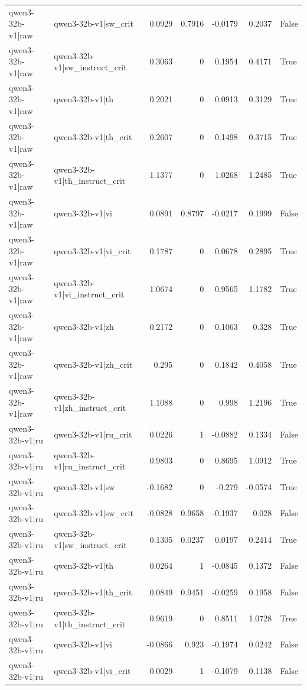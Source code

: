 \begin{table}
\begin{tabular}{l l r r r r l}
qwen3-32b-v1|raw & qwen3-32b-v1|sw_crit & 0.0929 & 0.7916 & -0.0179 & 0.2037 & False \\
qwen3-32b-v1|raw & qwen3-32b-v1|sw_instruct_crit & 0.3063 & 0 & 0.1954 & 0.4171 & True \\
qwen3-32b-v1|raw & qwen3-32b-v1|th & 0.2021 & 0 & 0.0913 & 0.3129 & True \\
qwen3-32b-v1|raw & qwen3-32b-v1|th_crit & 0.2607 & 0 & 0.1498 & 0.3715 & True \\
qwen3-32b-v1|raw & qwen3-32b-v1|th_instruct_crit & 1.1377 & 0 & 1.0268 & 1.2485 & True \\
qwen3-32b-v1|raw & qwen3-32b-v1|vi & 0.0891 & 0.8797 & -0.0217 & 0.1999 & False \\
qwen3-32b-v1|raw & qwen3-32b-v1|vi_crit & 0.1787 & 0 & 0.0678 & 0.2895 & True \\
qwen3-32b-v1|raw & qwen3-32b-v1|vi_instruct_crit & 1.0674 & 0 & 0.9565 & 1.1782 & True \\
qwen3-32b-v1|raw & qwen3-32b-v1|zh & 0.2172 & 0 & 0.1063 & 0.328 & True \\
qwen3-32b-v1|raw & qwen3-32b-v1|zh_crit & 0.295 & 0 & 0.1842 & 0.4058 & True \\
qwen3-32b-v1|raw & qwen3-32b-v1|zh_instruct_crit & 1.1088 & 0 & 0.998 & 1.2196 & True \\
qwen3-32b-v1|ru & qwen3-32b-v1|ru_crit & 0.0226 & 1 & -0.0882 & 0.1334 & False \\
qwen3-32b-v1|ru & qwen3-32b-v1|ru_instruct_crit & 0.9803 & 0 & 0.8695 & 1.0912 & True \\
qwen3-32b-v1|ru & qwen3-32b-v1|sw & -0.1682 & 0 & -0.279 & -0.0574 & True \\
qwen3-32b-v1|ru & qwen3-32b-v1|sw_crit & -0.0828 & 0.9658 & -0.1937 & 0.028 & False \\
qwen3-32b-v1|ru & qwen3-32b-v1|sw_instruct_crit & 0.1305 & 0.0237 & 0.0197 & 0.2414 & True \\
qwen3-32b-v1|ru & qwen3-32b-v1|th & 0.0264 & 1 & -0.0845 & 0.1372 & False \\
qwen3-32b-v1|ru & qwen3-32b-v1|th_crit & 0.0849 & 0.9451 & -0.0259 & 0.1958 & False \\
qwen3-32b-v1|ru & qwen3-32b-v1|th_instruct_crit & 0.9619 & 0 & 0.8511 & 1.0728 & True \\
qwen3-32b-v1|ru & qwen3-32b-v1|vi & -0.0866 & 0.923 & -0.1974 & 0.0242 & False \\
qwen3-32b-v1|ru & qwen3-32b-v1|vi_crit & 0.0029 & 1 & -0.1079 & 0.1138 & False \\

\end{tabular}
\end{table}
